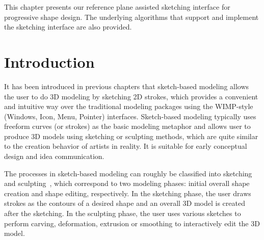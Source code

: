 This chapter presents our reference plane assisted sketching
interface for progressive shape design. The underlying algorithms
that support and implement the sketching interface are also
provided.

\section{Introduction}
\label{ch3:sec:intro}


It has been introduced in previous chapters that sketch-based
modeling allows the user to do 3D modeling by sketching 2D strokes,
which provides a convenient and intuitive way over the traditional
modeling packages using the WIMP-style (Windows, Icon, Menu,
Pointer) interfaces. Sketch-based modeling typically uses freeform
curves (or strokes) as the basic modeling metaphor and allows user
to produce 3D models using sketching or sculpting methods, which are
quite similar to the creation behavior of artists in reality. It is 
suitable for early conceptual design and idea communication.


The processes in sketch-based modeling can roughly be classified
into sketching and sculpting~\cite{CIW08}, which correspond to two
modeling phases: initial overall shape creation and shape editing,
respectively. In the sketching phase, the user draws strokes as the
contours of a desired shape and an overall 3D model is created after
the sketching. In the sculpting phase, the user uses various
sketches to perform carving, deformation, extrusion or smoothing to
interactively edit the 3D model.

